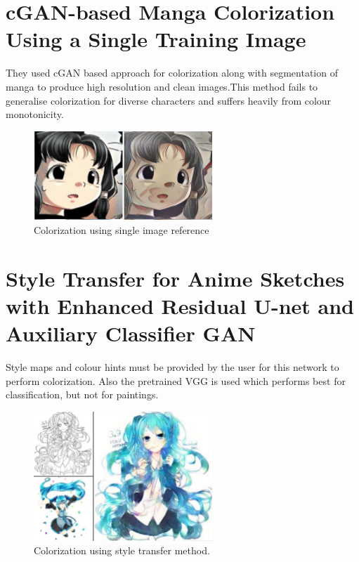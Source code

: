     \section{cGAN-based Manga Colorization Using a Single Training Image\cite{hensman2017cganbased}}
    They used cGAN based approach for colorization along with segmentation of manga to produce high resolution and clean images.This method fails to generalise colorization for diverse characters and suffers heavily from colour monotonicity. 
    \begin{figure}[htbp]
        \centering
        \includegraphics[width=0.6\textwidth]{img/model2.png}
        \caption{Colorization using single image reference}
        \label{fig:Model-2}
      \end{figure}

    \section{Style Transfer for Anime Sketches with Enhanced Residual U-net and Auxiliary Classifier GAN\cite{ACPR2017ZLM}}
    Style maps and colour hints must be provided by the user for this network to perform colorization. Also the pretrained VGG is used which performs best for classification, but not for paintings.
    \begin{figure}[htbp]
        \centering
        \includegraphics[width=0.6\textwidth]{img/model3.png}
        \caption{Colorization using style transfer method.}
        \label{fig:Model-3}
      \end{figure}
\newpage
